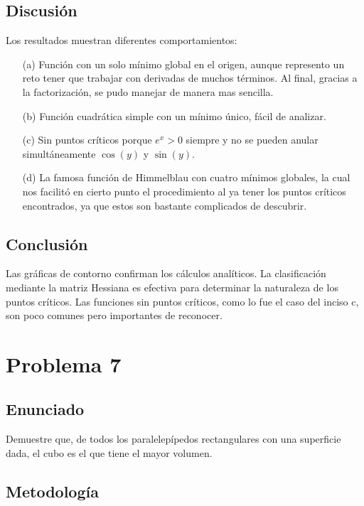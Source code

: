 \documentclass{article}
\begin{document}
\subsection{Discusión}

Los resultados muestran diferentes comportamientos:
\begin{enumerate}
    \item[(a)] Función con un solo mínimo global en el origen, aunque represento un reto tener que trabajar con derivadas de muchos términos. Al final, gracias a la factorización, se pudo manejar de manera mas sencilla.
    \item[(b)] Función cuadrática simple con un mínimo único, fácil de analizar.
    \item[(c)] Sin puntos críticos porque $e^x > 0$ siempre y no se pueden anular simultáneamente $\cos(y)$ y $\sin(y)$.
    \item[(d)] La famosa función de Himmelblau con cuatro mínimos globales, la cual nos facilitó en cierto punto el procedimiento al ya tener los puntos críticos encontrados, ya que estos son bastante complicados de descubrir.
\end{enumerate}

\subsection{Conclusión}

Las gráficas de contorno confirman los cálculos analíticos. La clasificación mediante la matriz Hessiana es efectiva para determinar la naturaleza de los puntos críticos. Las funciones sin puntos críticos, como lo fue el caso del inciso c, son poco comunes pero importantes de reconocer.

\section{Problema 7}

\subsection{Enunciado}
Demuestre que, de todos los paralelepípedos rectangulares con una superficie dada, el cubo es el que tiene el mayor volumen.

\subsection{Metodología}
\end{document}
